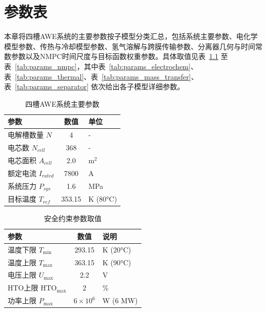 
\chapter{参数表}
\label{app:params}

本章将四槽AWE系统的主要参数按子模型分类汇总，包括系统主要参数、电化学模型参数、传热与冷却模型参数、氢气溶解与跨膜传输参数、分离器几何与时间常数参数以及NMPC时间尺度与目标函数权重参数。具体取值见表~\ref{tab:system_params} 至表~\ref{tab:params_nmpc}，其中表~\ref{tab:params_electrochem}、表~\ref{tab:params_thermal}、表~\ref{tab:params_mass_transfer}、表~\ref{tab:params_separator} 依次给出各子模型详细参数。

\begin{table}[!htbp]
  \centering
  \caption{四槽AWE系统主要参数}
  \label{tab:system_params}
  \small
  \begin{tabular}{@{}l c l@{}}
    \toprule
    \textbf{参数} & \textbf{数值} & \textbf{单位} \\
    \midrule
    电解槽数量 $N$ & 4 & - \\
    电芯数 $N_{cell}$ & 368 & - \\
    电芯面积 $A_{cell}$ & 2.0 & $\mathrm{m}^2$ \\
    额定电流 $I_{rated}$ & 7800 & A \\
    系统压力 $P_{sys}$ & 1.6 & MPa \\
    目标温度 $T_{ref}$ & 353.15 & K (80°C) \\
    \bottomrule
  \end{tabular}
\end{table}

\begin{table}[!htbp]
  \centering
  \caption{安全约束参数取值}
  \label{tab:params_constraints}
  \small
  \begin{tabular}{@{}l c l@{}}
    \toprule
    \textbf{参数} & \textbf{数值} & \textbf{说明} \\
    \midrule
    温度下限 $T_{\min}$ & 293.15 & K (20°C) \\
    温度上限 $T_{\max}$ & 363.15 & K (90°C) \\
    电压上限 $U_{\max}$ & 2.2 & V \\
    HTO上限 $\mathrm{HTO}_{\max}$ & 2 & \% \\
    功率上限 $P_{\max}$ & $6 \times 10^{6}$ & W (6 MW) \\
    \bottomrule
  \end{tabular}
\end{table}

